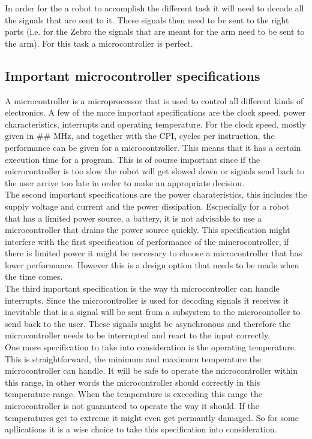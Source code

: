 \documentclass{article}
\begin{document}
In order for the a robot to accomplish the different task it will need to decode all the signals that are sent to it. These signals then need to be sent to the right parts (i.e. for the Zebro the signals that are meant for the arm need to be sent to the arm). For this task a microcontroller is perfect.

\subsection{Important microcontroller specifications}

A microcontroller is a microprocessor that is used to control all different kinds of electronics. A few of the more important specifications are the clock speed, power characteristics, interrupts and operating temperature. For the clock speed, mostly given in \#\# MHz, and together with the CPI, cycles per instruction, the performance can be given for a microcontroller. This means that it has a certain execution time for a program. This is of course important since if the microcontroller is too slow the robot will get slowed down or signals send back to the user arrive too late in order to make an appropriate decision. \\
The second important specifications are the power charateristics, this includes the supply voltage and current and the power dissipation. Escpecially for a robot that has a limited power source, a battery, it is not advisable to use a microcontroller that drains the power source quickly. This specification might interfere with the first specification of performance of the mincrocontroller, if there is limited power it might be neccesary to choose a microcontroller that has lower performance. However this is a design option that needs to be made when the time comes.\\
The third important specification is the way th microcontroller can handle interrupts. Since the microcontroller is used for decoding signals it receives it inevitable that is a signal will be sent from a subsystem to the microcontoller to send back to the user. These signals might  be asynchronous and therefore the microcontroller needs to be interrupted and react to the input correctly.\\
One more specification to take into consideration is the operating temperature. This is straightforward, the minimum and maximum temperature the microcontroller can handle. It will be safe to operate the microcontroller within this range, in other words the microcontroller should correctly in this temperature range. When the temperature is exceeding this range the microcontroller is not guaranteed to operate the way it should. If the temperatures get to extreme it might even get permantly damaged. So for some apllications it is a wise choice to take this specification into consideration.\\
\end{document}
